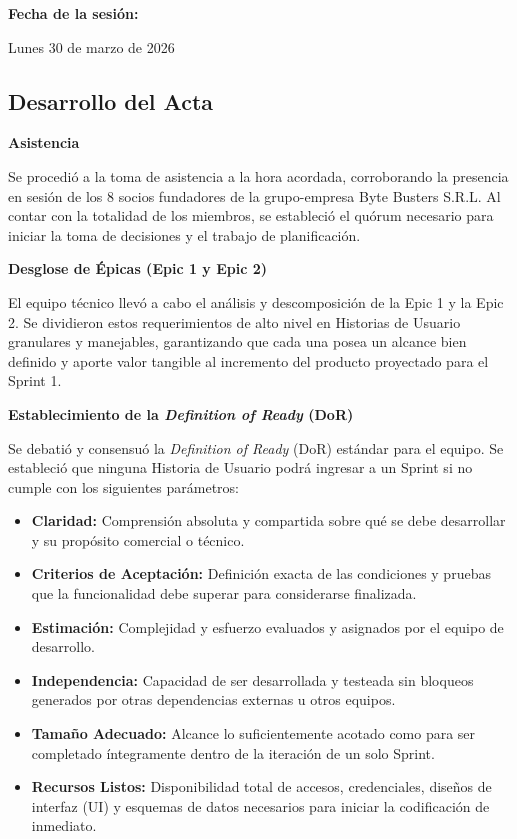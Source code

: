 \noindent \textbf{Fecha de la sesión:}\par
Lunes 30 de marzo de 2026

\newpage
\subsection{Desarrollo del Acta}

\noindent \textbf{Asistencia}\par
Se procedió a la toma de asistencia a la hora acordada, corroborando la presencia en sesión de los 8 socios fundadores de la grupo-empresa Byte Busters S.R.L. Al contar con la totalidad de los miembros, se estableció el quórum necesario para iniciar la toma de decisiones y el trabajo de planificación.

\vspace*{0.5cm}
\noindent\textbf{Desglose de Épicas (Epic 1 y Epic 2)}\par
El equipo técnico llevó a cabo el análisis y descomposición de la Epic 1 y la Epic 2. Se dividieron estos requerimientos de alto nivel en Historias de Usuario granulares y manejables, garantizando que cada una posea un alcance bien definido y aporte valor tangible al incremento del producto proyectado para el Sprint 1.

\vspace*{0.5cm}
\noindent \textbf{Establecimiento de la \textit{Definition of Ready} (DoR)}\par
Se debatió y consensuó la \textit{Definition of Ready} (DoR) estándar para el equipo. Se estableció que ninguna Historia de Usuario podrá ingresar a un Sprint si no cumple con los siguientes parámetros:
\begin{itemize}[noitemsep]
    \item \textbf{Claridad:} Comprensión absoluta y compartida sobre qué se debe desarrollar y su propósito comercial o técnico.
    \item \textbf{Criterios de Aceptación:} Definición exacta de las condiciones y pruebas que la funcionalidad debe superar para considerarse finalizada.
    \item \textbf{Estimación:} Complejidad y esfuerzo evaluados y asignados por el equipo de desarrollo.
    \item \textbf{Independencia:} Capacidad de ser desarrollada y testeada sin bloqueos generados por otras dependencias externas u otros equipos.
    \item \textbf{Tamaño Adecuado:} Alcance lo suficientemente acotado como para ser completado íntegramente dentro de la iteración de un solo Sprint.
    \item \textbf{Recursos Listos:} Disponibilidad total de accesos, credenciales, diseños de interfaz (UI) y esquemas de datos necesarios para iniciar la codificación de inmediato.
\end{itemize}

